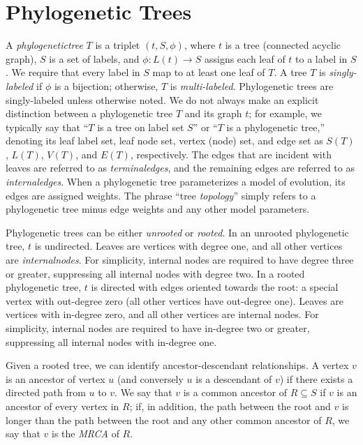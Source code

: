 \section{Phylogenetic Trees}
\label{sec:background-tree}
A \textit{\gls{phylogenetictree}} $T$ is a triplet $(t, S, \phi)$, where $t$ is a tree (connected acyclic graph), $S$ is a set of labels, and $\phi : L(t) \rightarrow S$ assigns each leaf of $t$ to a label in $S$.
We require that every label in $S$ map to at least one leaf of $T$. 
A tree $T$ is \textit{\gls{singly-labeled}} if $\phi$ is a bijection; otherwise, $T$ is \textit{\gls{multi-labeled}}.
Phylogenetic trees are singly-labeled unless otherwise noted.
We do not always make an explicit distinction between a phylogenetic tree $T$ and its graph $t$; for example, we typically say that ``$T$ is a tree on label set $S$'' or ``$T$ is a phylogenetic tree,'' denoting its leaf label set, leaf node set, vertex (node) set, and edge set as $S(T)$, $L(T)$, $V(T)$, and $E(T)$, respectively.
The edges that are incident with leaves are referred to as \textit{\glspl{terminaledge}}, and the remaining edges are referred to as \textit{\glspl{internaledge}}.
When a phylogenetic tree parameterizes a model of evolution, its edges are assigned weights.
The phrase ``tree \textit{\gls{topology}}'' simply refers to a phylogenetic tree minus edge weights and any other model parameters.

Phylogenetic trees can be either \textit{\gls{unrooted}} or \textit{\gls{rooted}}.
In an unrooted phylogenetic tree, $t$ is undirected.
Leaves are vertices with degree one, and all other vertices are \textit{\glspl{internalnode}}. 
For simplicity, internal nodes are required to have degree three or greater, suppressing all internal nodes with degree two.
In a rooted phylogenetic tree, $t$ is directed with edges oriented towards the root: a special vertex with out-degree zero (all other vertices have out-degree one).
Leaves are vertices with in-degree zero, and all other vertices are internal nodes.
For simplicity, internal nodes are required to have in-degree two or greater, suppressing all internal nodes with in-degree one.

Given a rooted tree, we can identify ancestor-descendant relationships.
A vertex $v$ is an ancestor of vertex $u$ (and conversely $u$ is a descendant of $v$) if there exists a directed path from $u$ to $v$.
We say that $v$ is a common ancestor of $R \subseteq S$ if $v$ is an ancestor of every vertex in $R$; if, in addition, the path between the root and $v$ is longer than the path between the root and any other common ancestor of $R$, we say that $v$ is the \textit{\gls{MRCA}} of $R$. 

